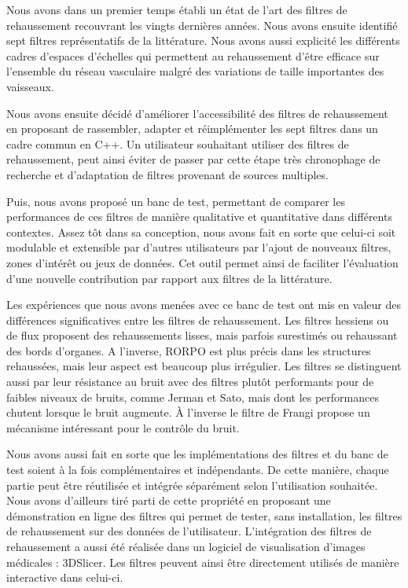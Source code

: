 Nous avons dans un premier temps établi un état de l'art des filtres de rehaussement recouvrant les vingts dernières années. Nous avons ensuite identifié sept filtres représentatifs de la littérature. Nous avons aussi explicité les différents cadres d'espaces d'échelles qui permettent au rehaussement d'être efficace sur l'ensemble du réseau vasculaire malgré des variations de taille importantes des vaisseaux.

Nous avons ensuite décidé d'améliorer l'accessibilité des filtres de rehaussement en proposant de rassembler, adapter et réimplémenter les sept filtres dans un cadre commun en C++. Un utilisateur souhaitant utiliser des filtres de rehaussement, peut ainsi éviter de passer par cette étape très chronophage de recherche et d'adaptation de filtres provenant de sources multiples. 

Puis, nous avons proposé un banc de test, permettant de comparer les performances de ces filtres de manière qualitative et quantitative dans différents contextes. Assez tôt dans sa conception, nous avons fait en sorte que celui-ci soit modulable et extensible par d'autres utilisateurs par l'ajout de nouveaux filtres, zones d'intérêt ou jeux de données. Cet outil permet ainsi de faciliter l'évaluation d'une nouvelle contribution par rapport aux filtres de la littérature.

Les expériences que nous avons menées avec ce banc de test ont mis en valeur des différences significatives entre les filtres de rehaussement. Les filtres hessiens ou de flux proposent des rehaussements lisses, mais parfois surestimés ou rehaussant des bords d'organes. A l'inverse, RORPO est plus précis dans les structures rehaussées, mais leur aspect est beaucoup plus irrégulier. Les filtres se distinguent aussi par leur résistance au bruit avec des filtres plutôt performants pour de faibles niveaux de bruits, comme Jerman et Sato, mais dont les performances chutent lorsque le bruit augmente. À l'inverse le filtre de Frangi propose un mécanisme intéressant pour le contrôle du bruit.

Nous avons aussi fait en sorte que les implémentations des filtres et du banc de test soient à la fois complémentaires et indépendants. De cette manière, chaque partie peut être réutilisée et intégrée séparément selon l'utilisation souhaitée. Nous avons d'ailleurs tiré parti de cette propriété en proposant une démonstration en ligne des filtres qui permet de tester, sans installation, les filtres de rehaussement sur des données de l'utilisateur. L'intégration des filtres de rehaussement a aussi été réalisée dans un logiciel de visualisation d'images médicales : 3DSlicer. Les filtres peuvent ainsi être directement utilisés de manière interactive dans celui-ci.

